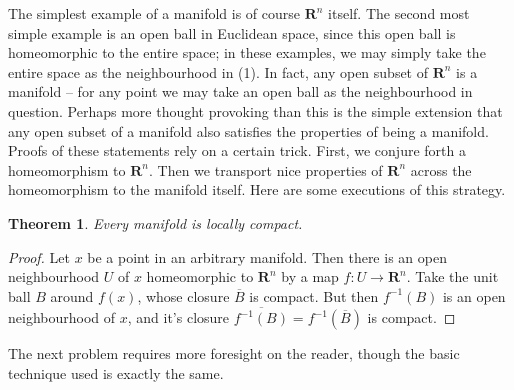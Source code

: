 \documentclass[12pt]{report}
\theoremstyle{plain}
\newtheorem{theorem}{Theorem}[chapter]
\theoremstyle{definition}
\begin{document}

The simplest example of a manifold is of course $\mathbf{R}^n$ itself. The second most simple example is an open ball in Euclidean space, since this open ball is homeomorphic to the entire space; in these examples, we may simply take the entire space as the neighbourhood in (1). In fact, any open subset of $\mathbf{R}^n$ is a manifold -- for any point we may take an open ball as the neighbourhood in question. Perhaps more thought provoking than this is the simple extension that any open subset of a manifold also satisfies the properties of being a manifold. Proofs of these statements rely on a certain trick. First, we conjure forth a homeomorphism to $\mathbf{R}^n$. Then we transport nice properties of $\mathbf{R}^n$ across the homeomorphism to the manifold itself. Here are some executions of this strategy.

\begin{theorem}
    Every manifold is locally compact.
\end{theorem}
\begin{proof}
    Let $x$ be a point in an arbitrary manifold. Then there is an open neighbourhood $U$ of $x$ homeomorphic to $\mathbf{R}^n$ by a map $f:U \to \mathbf{R}^n$. Take the unit ball $B$ around $f(x)$, whose closure $\overline{B}$ is compact. But then $f^{-1}(B)$ is an open neighbourhood of $x$, and it's closure $\overline{f^{-1}(B)} = f^{-1}(\overline{B})$ is compact.
\end{proof}

The next problem requires more foresight on the reader, though the basic technique used is exactly the same.
\end{document}
